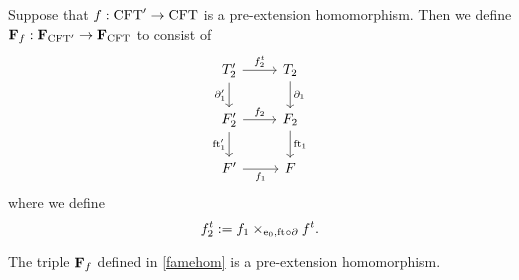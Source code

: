 \begin{defn}\label{famehom}
Suppose that $f:\mathrm{CFT}'\to\mathrm{CFT}$ is a pre-extension homomorphism. Then we
define $\mathbf{F}_{f}:\mathbf{F}_{\mathrm{CFT}'}\to\mathbf{F}_{\mathrm{CFT}}$ to consist of
\begin{equation*}
\begin{tikzcd}
\stesyst_2'
  \ar{r}{f^t_2}
  \ar{d}[swap]{\ebd[1]'}
  &
\stesyst_2
  \ar{d}{\ebd[1]}
  \\
\stesysf_2'
  \ar{r}{f_2}
  \ar{d}[swap]{\eft[1]'}
  &
\stesysf_2
  \ar{d}{\eft[1]}
  \\
\stesysf'
  \ar{r}[swap]{f_1}
  &
\stesysf
\end{tikzcd}
\end{equation*}
where we define
\begin{equation*}
f^t_2 := \pullback{f_1}{f^t}{\ectxext}{\eft\circ\ebd}.
\end{equation*}
\end{defn}

\begin{lem}
The triple $\mathbf{F}_{f}$ defined in \autoref{famehom} is a pre-extension homomorphism.
\end{lem}

